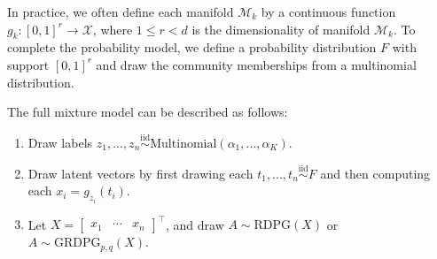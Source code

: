 \documentclass[12pt]{article}
\providecommand{\tightlist}{%
  \setlength{\itemsep}{0pt}\setlength{\parskip}{0pt}}
\begin{document}
In practice, we often define each manifold \(\mathcal{M}_k\) by a
continuous function \(g_k : [0, 1]^r \to \mathcal{X}\), where
\(1 \leq r < d\) is the dimensionality of manifold \(\mathcal{M}_k\). To
complete the probability model, we define a probability distribution
\(F\) with support \([0, 1]^r\) and draw the community memberships from
a multinomial distribution.

The full mixture model can be described as follows:

\begin{enumerate}
\def\labelenumi{\arabic{enumi}.}
\tightlist
\item
  Draw labels
  \(z_1, ..., z_n \stackrel{\mathrm{iid}}{\sim}\mathrm{Multinomial}(\alpha_1, ..., \alpha_K)\).
\item
  Draw latent vectors by first drawing each
  \(t_1, ..., t_n \stackrel{\mathrm{iid}}{\sim}F\) and then computing
  each \(x_i = g_{z_i}(t_i)\).
\item
  Let \(X = \begin{bmatrix} x_1 & \cdots & x_n \end{bmatrix}^\top\), and
  draw \(A \sim \mathrm{RDPG}(X)\) or
  \(A \sim \mathrm{GRDPG}_{p,q}(X)\).
\end{enumerate}
\end{document}
